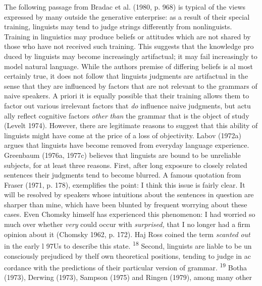 \begin{styleStandard}
The following passage from Bradac et al. (1980, p. 968) is typical of the views expressed by many outside the generative enterprise: {\textquotedbl}as a result of their special training, linguists may tend to judge strings differently from nonlinguists. Training in linguistics may produce beliefs or attitudes which are not shared by those who have not received such training. This suggests that the knowledge pro\- duced by linguists may become increasingly artifactual; it may fail increasingly to model natural language.{\textquotedbl} While the authors{\textquotesingle} premise of differing beliefs is al\- most certainly true, it does not follow that linguists{\textquotesingle} judgments are artifactual in the sense that they are influenced by factors that are not relevant to the grammars of naive speakers. A priori it is equally possible that their training allows them to factor out various irrelevant factors that \textit{do}\textit{ }influence naive judgments, but actu\- ally reflect cognitive factors \textit{other}\textit{ }\textit{than}\textit{ }the grammar that is the object of study (Levelt 1974). However, there are legitimate reasons to suggest that this ability of linguists might have come at the price of a loss of objectivity. Labov (1972a) argues that linguists have become removed from everyday language experience. Greenbaum (1976a, 1977c) believes that linguists are bound to be unreliable subjects, for at least three reasons. First, after long exposure to closely related sentences their judgments tend to become blurred. A famous quotation from Fraser (1971, p. 178), exemplifies the point: {\textquotedbl}I think this issue is fairly clear. It will be resolved by speakers whose intuitions about the sentences in question are sharper than mine, which have been blunted by frequent worrying about these cases.{\textquotedbl} Even Chomsky himself has experienced this phenomenon: {\textquotedbl}I had worried so much over whether \textit{very}\textit{ }could occur with \textit{surprised,}\textit{ }that I no longer had a firm opinion about it{\textquotedbl} (Chomsky 1962, p. 172). Haj Ross coined the term \textit{scanted}\textit{ }\textit{out}\textit{ }in the early l 97Us to describe this state. \textsuperscript{18 }Second, linguists are liable to be un\- consciously prejudiced by thelf own theoretical positions, tending to judge in ac\- cordance with the predictions of their particular version of grammar. \textsuperscript{19}\textsuperscript{ }Botha (1973), Derwing (1973), Sampson (1975) and Ringen (1979), among many other
\end{styleStandard}



